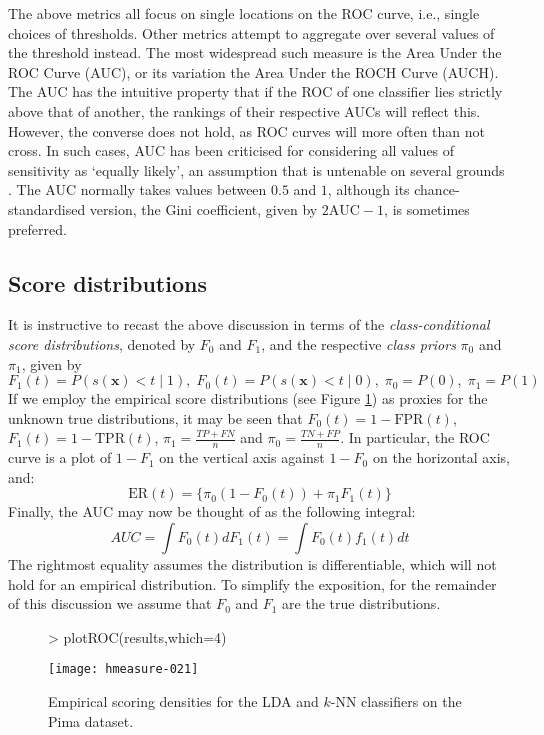 \documentclass{article}
\begin{document}
The above metrics all focus on single locations on the ROC curve, i.e., single choices of thresholds. Other metrics attempt to aggregate over several values of the threshold instead. The most widespread such measure is the Area Under the ROC Curve (AUC), or its variation the Area Under the ROCH Curve (AUCH). The AUC has the intuitive property that if the ROC of one classifier lies strictly above that of another, the rankings of their respective AUCs will reflect this. However, the converse does not hold, as ROC curves will more often than not cross. In such cases, AUC has been criticised for considering all values of sensitivity as `equally likely', an assumption that is untenable on several grounds \cite{hand2009}. The AUC normally takes values between $0.5$ and $1$, although its chance-standardised version, the Gini coefficient, given by $2\text{AUC} -1$, is sometimes preferred.

\subsection{Score distributions}
It is instructive to recast the above discussion in terms of the \emph{class-conditional score distributions}, denoted by $F_0$ and $F_1$, and the respective \emph{class priors} $\pi_0$ and $\pi_1$, given by
\[
F_1(t) = P(s(\mathbf{x}) < t \mid 1), \; F_0(t) = P(s(\mathbf{x}) < t \mid 0), \; \pi_0 = P(0), \; \pi_1 = P(1)
\]
If we employ the empirical score distributions (see Figure \ref{fig:scores}) as proxies for the unknown true distributions, it may be seen that $F_0(t)=1-\text{FPR}(t)$, $F_1(t)=1-\text{TPR}(t)$, $\pi_1 = \frac{TP+FN}{n}$ and $\pi_0 = \frac{TN+FP}{n}$. In particular, the ROC curve is a plot of $1-F_1$ on the vertical axis against $1-F_0$ on the horizontal axis, and: 
\[
\text{ER}(t) = \{\pi_0(1-F_0(t)) + \pi_1 F_1(t)\}
\]
Finally, the AUC may now be thought of as the following integral:
\[
AUC = \int F_0(t) d F_1(t) = \int F_0(t) f_1(t) dt
\]
The rightmost equality assumes the distribution is differentiable, which will not hold for an empirical distribution. To simplify the exposition, for the remainder of this discussion we assume that $F_0$ and $F_1$ are the true distributions.

\begin{figure}
\begin{Schunk}
\begin{Sinput}
> plotROC(results,which=4)
\end{Sinput}
\end{Schunk}
\texttt{[image: hmeasure-021]}
\caption{\label{fig:scores}Empirical scoring densities for the LDA and $k$-NN classifiers on the Pima dataset.}
\end{figure}
\end{document}
